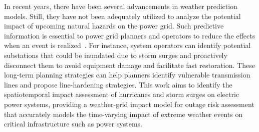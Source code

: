 In recent years, there have been several advancements in weather prediction models. Still, they have not been adequately utilized to analyze the potential impact of upcoming natural hazards on the power grid. Such predictive information is essential to power grid planners and operators to reduce the effects when an event is realized~\cite{9942328, 9810633}. For instance, system operators can identify potential substations that could be inundated due to storm surges and proactively disconnect them to avoid equipment damage and facilitate fast restoration. These long-term planning strategies can help planners identify vulnerable transmission lines and propose line-hardening strategies. This work aims to identify the spatiotemporal impact assessment of hurricanes and storm surges on electric power systems, providing a weather-grid impact model for outage risk assessment that accurately models the time-varying impact of extreme weather events on critical infrastructure such as power systems.
